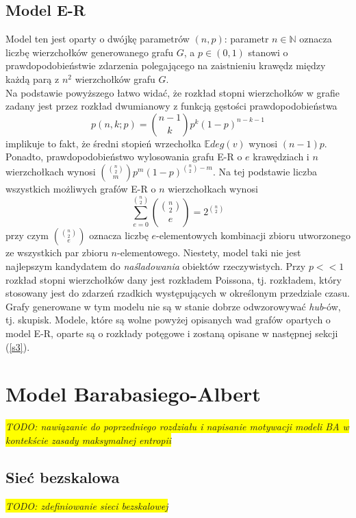 \documentclass{article}
\newcommand{\todo}[1]{
	\colorbox{yellow} {{\color{red}
	\emph {TODO: #1}
}}}
\begin{document}
\subsection{Model E-R}
	Model ten jest oparty o dwójkę parametrów $(n, p)$: parametr $n \in \mathbb{N}$ oznacza liczbę wierzchołków generowanego grafu $G$, a $p \in
	(0, 1)$ stanowi o prawdopodobieństwie zdarzenia polegającego na zaistnieniu krawędz między każdą parą z $n^2$ wierzchołków grafu $G$. \\
	Na podstawie powyższego łatwo widać, że rozkład stopni wierzchołków w grafie zadany jest przez rozkład dwumianowy z funkcją
	gęstości prawdopodobieństwa 
	\begin{equation}
		p(n,k; p) = \binom{n-1}{k}p^{k}(1-p)^{n-k - 1}
	\end{equation}
	implikuje to fakt, że średni stopień wrzechołka $\mathbb{E}deg(v)$ wynosi $(n-1)p$. Ponadto, prawdopodobieństwo wylosowania grafu E-R o $e$ krawędziach i $n$ wierzchołkach wynosi
	$\binom{\binom{n}{2}}{m}p^{m}(1-p)^{\binom{n}{2} - m}$. Na tej podstawie liczba wszystkich możliwych grafów E-R o $n$ wierzchołkach wynosi
	\begin{equation}
		\sum_{e = 0}^{\binom{n}{2}} \binom{\binom{n}{2}}{e} = 2^{\binom{n}{2}}
	\end{equation}
	przy czym $\binom{\binom{n}{2}}{e}$ oznacza liczbę $e$-elementowych kombinacji zbioru utworzonego ze wszystkich par zbioru $n$-elementowego. \newline
	Niestety, model taki nie jest najlepszym kandydatem do \textit{naśladowania} obiektów rzeczywistych. Przy $p << 1$ rozkład stopni wierzchołków dany jest rozkładem Poissona, tj. rozkładem, który stosowany jest do zdarzeń rzadkich występujących w określonym przedziale czasu. Grafy generowane w tym modelu nie są w stanie dobrze odwzorowywać \textit{hub}-ów, tj. skupisk. \newline
	Modele, które są wolne powyżej opisanych wad grafów opartych o model E-R, oparte są o rozkłady potęgowe i zostaną opisane w następnej sekcji (\ref{s3}).
\section{Model Barabasiego-Albert \label{s3}}
	\todo{nawiązanie do poprzedniego rozdziału i napisanie motywacji modeli BA w kontekście zasady maksymalnej entropii}
\subsection{Sieć bezskalowa}
	\todo{zdefiniowanie sieci bezskalowej}
\end{document}
